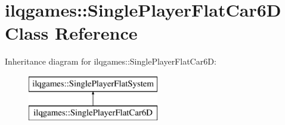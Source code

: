 \hypertarget{classilqgames_1_1_single_player_flat_car6_d}{}\section{ilqgames\+:\+:Single\+Player\+Flat\+Car6D Class Reference}
\label{classilqgames_1_1_single_player_flat_car6_d}
Inheritance diagram for ilqgames\+:\+:Single\+Player\+Flat\+Car6D\+:\begin{figure}[H]
\begin{center}
\leavevmode
\includegraphics[height=2.000000cm]{classilqgames_1_1_single_player_flat_car6_d}
\end{center}
\end{figure}
